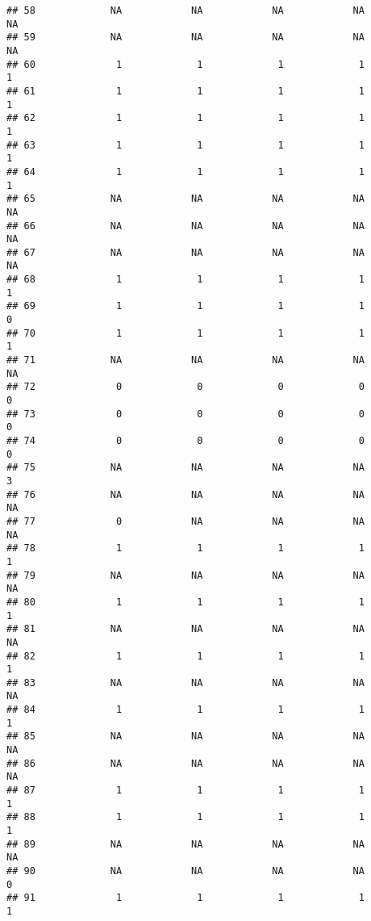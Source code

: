 \documentclass[
]{article}
\begin{document}
\begin{verbatim}
## 58             NA            NA            NA            NA            NA
## 59             NA            NA            NA            NA            NA
## 60              1             1             1             1             1
## 61              1             1             1             1             1
## 62              1             1             1             1             1
## 63              1             1             1             1             1
## 64              1             1             1             1             1
## 65             NA            NA            NA            NA            NA
## 66             NA            NA            NA            NA            NA
## 67             NA            NA            NA            NA            NA
## 68              1             1             1             1             1
## 69              1             1             1             1             0
## 70              1             1             1             1             1
## 71             NA            NA            NA            NA            NA
## 72              0             0             0             0             0
## 73              0             0             0             0             0
## 74              0             0             0             0             0
## 75             NA            NA            NA            NA             3
## 76             NA            NA            NA            NA            NA
## 77              0            NA            NA            NA            NA
## 78              1             1             1             1             1
## 79             NA            NA            NA            NA            NA
## 80              1             1             1             1             1
## 81             NA            NA            NA            NA            NA
## 82              1             1             1             1             1
## 83             NA            NA            NA            NA            NA
## 84              1             1             1             1             1
## 85             NA            NA            NA            NA            NA
## 86             NA            NA            NA            NA            NA
## 87              1             1             1             1             1
## 88              1             1             1             1             1
## 89             NA            NA            NA            NA            NA
## 90             NA            NA            NA            NA             0
## 91              1             1             1             1             1

\end{verbatim}
\end{document}
